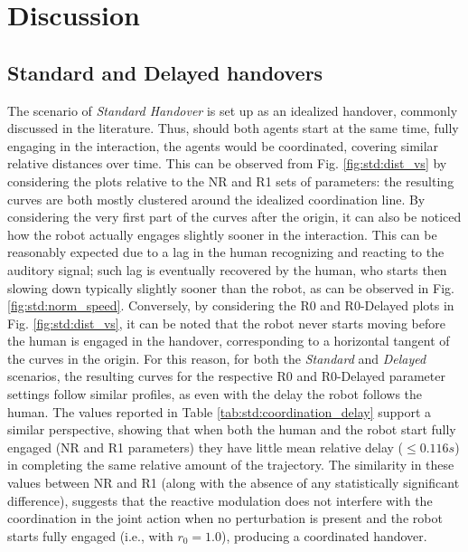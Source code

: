\documentclass[lettersize,journal]{IEEEtran}
\begin{document}
\section{Discussion}
\label{sec:discussion}

\subsection{Standard and Delayed handovers}

\noindent
The scenario of \textit{Standard Handover} is set up as an idealized handover, commonly discussed in the literature.
Thus, should both agents start at the same time, fully engaging in the interaction, the agents would be coordinated, covering similar relative distances over time.
This can be observed from Fig. \ref{fig:std:dist_vs} by considering the plots relative to the NR and R1 sets of parameters: the resulting curves are both mostly clustered around the idealized coordination line.
By considering the very first part of the curves after the origin, it can also be noticed how the robot actually engages slightly sooner in the interaction.
This can be reasonably expected due to a lag in the human recognizing and reacting to the auditory signal; such lag is eventually recovered by the human, who starts then slowing down typically slightly sooner than the robot, as can be observed in Fig. \ref{fig:std:norm_speed}.
Conversely, by considering the R0 and R0-Delayed plots in Fig. \ref{fig:std:dist_vs}, it can be noted that the robot never starts moving before the human is engaged in the handover, corresponding to a horizontal tangent of the curves in the origin.
For this reason, for both the \textit{Standard} and \textit{Delayed} scenarios, the resulting curves for the respective R0 and R0-Delayed parameter settings follow similar profiles, as even with the delay the robot follows the human. 
The values reported in  Table \ref{tab:std:coordination_delay} support a similar perspective, showing that when both the human and the robot start fully engaged (NR and R1 parameters) they have little mean relative delay ($\leq 0.116 s$) in completing the same relative amount of the trajectory.
The similarity in these values between NR and R1 (along with the absence of any statistically significant difference), suggests that the reactive modulation does not interfere with the coordination in the joint action when no perturbation is present and the robot starts fully engaged (i.e., with $r_0=1.0$), producing a coordinated handover.
\end{document}
